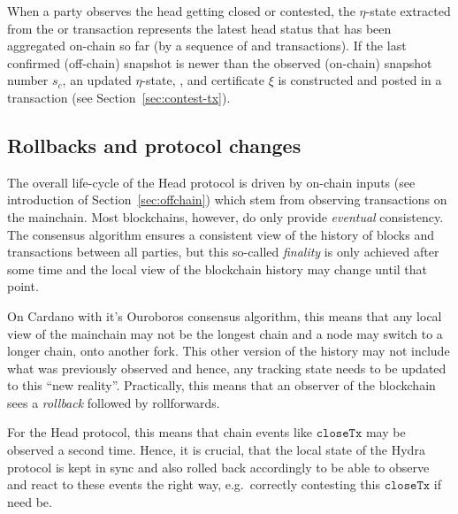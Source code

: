 \quad When a party observes
the head getting closed or contested, the $\eta$-state extracted from the
\mtxClose{} or \mtxContest{} transaction represents the latest head status that
has been aggregated on-chain so far (by a sequence of \mtxClose{} and
\mtxContest{} transactions). If the last confirmed (off-chain) snapshot is newer
than the observed (on-chain) snapshot number $s_{c}$, an updated $\eta$-state,
,
and certificate $\xi$ is constructed and posted in a \mtxContest{} transaction (see
Section~\ref{sec:contest-tx}).

\subsection{Rollbacks and protocol changes}\label{sec:rollbacks}
The overall life-cycle of the Head protocol is driven by on-chain inputs (see
introduction of Section~\ref{sec:offchain}) which stem from observing
transactions on the mainchain. Most blockchains, however, do only provide
\emph{eventual} consistency. The consensus algorithm ensures a consistent view
of the history of blocks and transactions between all parties, but this
so-called \emph{finality} is only achieved after some time and the local view of
the blockchain history may change until that point.

On Cardano with it's Ouroboros consensus algorithm, this means that any local
view of the mainchain may not be the longest chain and a node may switch to a
longer chain, onto another fork. This other version of the history may not
include what was previously observed and hence, any tracking state needs to be
updated to this ``new reality''. Practically, this means that an observer of the
blockchain sees a \emph{rollback} followed by rollforwards.

For the Head protocol, this means that chain events like $\mathtt{closeTx}$ may
be observed a second time. Hence, it is crucial, that the local state of the
Hydra protocol is kept in sync and also rolled back accordingly to be able to
observe and react to these events the right way, e.g.\ correctly contesting this
$\mathtt{closeTx}$ if need be.

